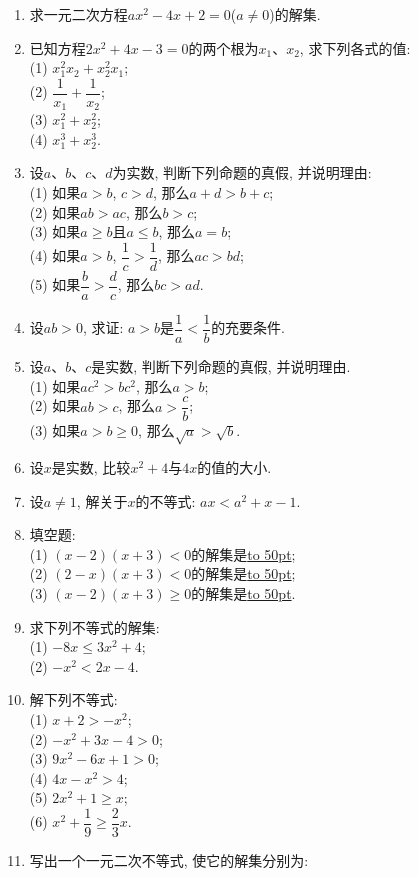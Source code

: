 \documentclass[10pt,a4paper]{article}
\newcommand{\blank}[1]{\underline{\hbox to #1pt{}}}
\begin{document}
\begin{enumerate}[1.]
\item 求一元二次方程$ax^2-4x+2=0$($a\ne 0$)的解集.
\item 已知方程$2x^2+4x-3=0$的两个根为$x_1$、$x_2$, 求下列各式的值:\\
(1) $x_1^2x_2+x_2^2x_1$;\\
(2) $\dfrac1{x_1}+\dfrac1{x_2}$;\\
(3) $x_1^2+x_2^2$;\\
(4) $x_1^3+x_2^3$. 
\item 设$a$、$b$、$c$、$d$为实数, 判断下列命题的真假, 并说明理由:\\
(1) 如果$a>b$, $c>d$, 那么$a+d>b+c$;\\
(2) 如果$ab>ac$, 那么$b>c$;\\
(3) 如果$a\ge b$且$a\le b$, 那么$a=b$;\\
(4) 如果$a>b$, $\dfrac 1c>\dfrac 1d$, 那么$ac>bd$;\\
(5) 如果$\dfrac ba>\dfrac dc$, 那么$bc>ad$.
\item 设$ab>0$, 求证: $a>b$是$\dfrac 1a<\dfrac 1b$的充要条件. 
\item 设$a$、$b$、$c$是实数, 判断下列命题的真假, 并说明理由.\\
(1) 如果$ac^2>bc^2$, 那么$a>b$;\\
(2) 如果$ab>c$, 那么$a>\dfrac cb$;\\
(3) 如果$a>b\ge 0$, 那么$\sqrt a>\sqrt b$.
\item 设$x$是实数, 比较$x^2+4$与$4x$的值的大小. 
\item 设$a\ne 1$, 解关于$x$的不等式: $ax<a^2+x-1$.
\item 填空题:\\
(1) $(x-2)(x+3)<0$的解集是\blank{50};\\
(2) $(2-x)(x+3)<0$的解集是\blank{50};\\
(3) $(x-2)(x+3)\ge 0$的解集是\blank{50}.
\item 求下列不等式的解集:\\
(1) $-8x\le 3x^2+4$;\\
(2) $-x^2<2x-4$. 
\item 解下列不等式:\\
(1) $x+2>-x^2$;\\
(2) $-x^2+3x-4>0$;\\
(3) $9x^2-6x+1>0$;\\
(4) $4x-x^2>4$;\\
(5) $2x^2+1\ge x$;\\
(6) $x^2+\dfrac 19\ge \dfrac 23x$.
\item 写出一个一元二次不等式, 使它的解集分别为:\\

\end{enumerate}
\end{document}
